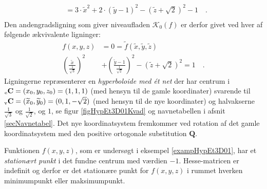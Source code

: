 \begin{example}
\begin{equation}
\begin{aligned}
&= 3 \cdot \widetilde{x}^{2} + 2\cdot\left(\widetilde{y} - 1 \right)^{2} - \left(\widetilde{z}+ \sqrt{2} \right)^{2}-1 \quad. \\
\end{aligned}
\end{equation}
Den andengradsligning som giver niveaufladen $\mathcal{K}_{0}(f)$ er derfor givet ved hver af følgende ækvivalente ligninger:
\begin{equation}
\begin{aligned}
f(x,y,z) &= 0=
\widetilde{f}(\widetilde{x}, \widetilde{y}, \widetilde{z}) \\
\left(\frac{\widetilde{x}}{\frac{1}{\sqrt{3}}}\right)^{2} &+ \left(\frac{\widetilde{y} - 1}{\frac{1}{\sqrt{2}}}\right)^{2} -  \left(\widetilde{z} +\sqrt{2}\right)^{2} = 1 \quad .
\end{aligned}
\end{equation}
Ligningerne  repræsenterer en \emph{hyperboloide med \'{e}t net} der har  centrum i ${_\mathrm{e}\mathbf{\mathbf{C}}} = (x_{0}, y_{0}, z_{0}) =  (1,1,1)$ (med hensyn til de gamle koordinater) svarende til
${_\mathrm{v}\mathbf{\mathbf{C}}} = (\widetilde{x}_{0}, \widetilde{y}_{0}) =  (0, 1, -\sqrt{2})$ (med hensyn til de nye koordinater)  og halvakserne $\frac{1}{\sqrt{3}}$ og $\frac{1}{\sqrt{2}}$, og $1$, se figur \ref{figHypEt3D01Kvad} og navnetabellen i afsnit \ref{secNavnetabel}. Det nye koordinatsystem fremkommer ved rotation af det gamle koordinatsystem med den positive ortogonale substitution  $\mathbf{Q}$.
\end{example}

\begin{think}
Funktionen $f(x,y,z)$, som er undersøgt i eksempel \ref{exampHypEt3D01},  har et {\emph{stationært punkt}} i det fundne centrum med værdien $-1$. Hesse-matricen er indefinit og derfor er det stationære punkt for $f(x,y,z)$ i rummet hverken  minimumpunkt eller maksimumpunkt.
\end{think}





